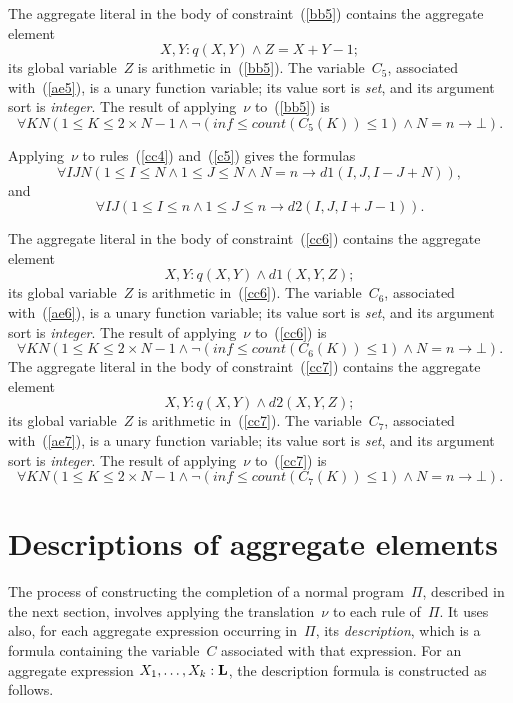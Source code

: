 \documentclass[11pt]{article}
\def\beq{\begin{equation}}
\def\eeq#1{\label{#1}\end{equation}}
\newcommand{\co}{\ensuremath{\mathit{count}}}
\begin{document}
\begin{adjustwidth}{-1cm}{-1cm}
The aggregate literal in the body of constraint~(\ref{bb5}) contains the
aggregate element
\beq
 X,Y : q(X,Y) \land Z = X+Y-1;
\eeq{ae5}
its global variable~$Z$ is arithmetic in~(\ref{bb5}).
The variable~$C_5$,
associated with~(\ref{ae5}), is a unary function variable; its value sort
is \emph{set}, and its argument sort is \emph{integer}.
The result of applying~$\nu$ to~(\ref{bb5}) is
\beq
\forall KN
(1\leq K\leq 2\times N-1
\land\neg(\mathit{inf}\leq\co(C_5(K))\leq 1)\land N=n\to\bot).
\eeq{b5f}

Applying~$\nu$ to rules~(\ref{cc4}) and~(\ref{c5}) gives the formulas
\beq
\forall I J  N(1\leq I\leq N \land 1\leq J\leq N
 \land N=n\to d1(I,J,I-J+N)),
\eeq{c4f}
and
\beq
\forall I J  (1\leq I\leq n \land 1\leq J\leq n
 \to d2(I,J,I+J-1)).
\eeq{c5f}

The aggregate literal in the body of constraint~(\ref{cc6}) contains the
aggregate element
\beq
 X,Y : q(X,Y) \land d1(X,Y,Z);
\eeq{ae6}
its global variable~$Z$ is arithmetic in~(\ref{cc6}).
The variable~$C_6$,
associated with~(\ref{ae6}), is a unary function variable; its value sort
is \emph{set}, and its argument sort is \emph{integer}.
The result of applying~$\nu$ to~(\ref{cc6}) is
\beq
\forall KN
(1\leq K\leq 2\times N-1 \land\neg(\mathit{inf}\leq\co(C_6(K))\leq 1)\land N=n\to\bot).
\eeq{c6f}
The aggregate literal in the body of constraint~(\ref{cc7}) contains the
aggregate element
\beq
 X,Y : q(X,Y) \land d2(X,Y,Z);
\eeq{ae7}
its global variable~$Z$ is arithmetic in~(\ref{cc7}).
The variable~$C_7$,
associated with~(\ref{ae7}), is a unary function variable; its value sort
is \emph{set}, and its argument sort is \emph{integer}.
The result of applying~$\nu$ to~(\ref{cc7}) is
\beq
\forall KN
(1\leq K\leq 2\times N-1
\land\neg(\mathit{inf}\leq\co(C_7(K))\leq 1)\land N=n\to\bot).
\eeq{c7f}

\section{Descriptions of aggregate elements}

The process of constructing the completion of a normal program~$\Pi$,
described in the next section, involves applying the translation~$\nu$
to each rule of~$\Pi$.  It uses also, for each aggregate expression
occurring in~$\Pi$, its \emph{description}, which is a
formula containing the variable~$C$ associated with that expression.
For an aggregate expression $X_1,\dots,X_k :{\bf L}$, the description
formula is constructed as follows.


\end{adjustwidth}
\end{document}
